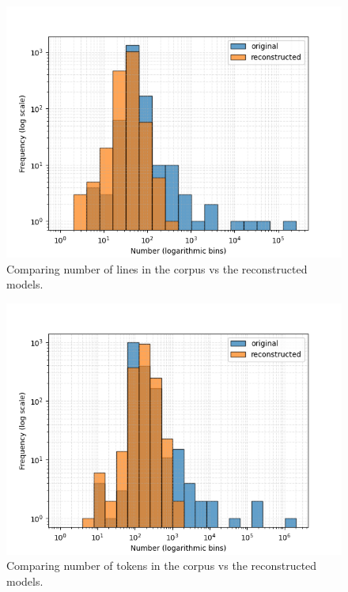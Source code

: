 \documentclass[conference]{IEEEtran}
\begin{document}
    
    \begin{figure}[htbp]
    \centerline{\includegraphics[width=\linewidth]{"./Comparing number of lines in the corpus vs the reconstructed models.png"}}
    \caption{Comparing number of lines in the corpus vs the reconstructed models.}
    \label{fig}
    \end{figure}
    
    
    \begin{figure}[htbp]
    \centerline{\includegraphics[width=\linewidth]{"./Comparing number of tokens in the corpus vs the reconstructed models.png"}}
    \caption{Comparing number of tokens in the corpus vs the reconstructed models.}
    \label{fig}
    \end{figure}
    
\end{document}

